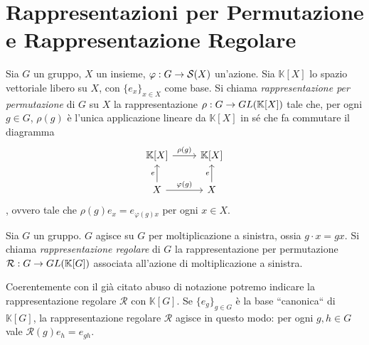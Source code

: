 \section{Rappresentazioni per Permutazione e Rappresentazione Regolare}

\begin{definition}
Sia $G$ un gruppo, $X$ un insieme, $\varphi:G\to \mathcal{S}(X)$ un'azione. Sia $\mathbb{K}[X]$ lo spazio vettoriale libero su $X$, con $\{e_x\}_{x\in X}$ come base. Si chiama \emph{rappresentazione per permutazione} di $G$ su $X$ la rappresentazione $\rho:G\to GL(\mathbb{K}[X])$ tale che, per ogni $g\in G$, $\rho(g)$ è l'unica applicazione lineare da $\mathbb{K}[X]$ in sé che fa commutare il diagramma
$$
\begin{tikzcd}
\mathbb{K}[X]\arrow[r,"\rho(g)"]&\mathbb{K}[X]\\
X\arrow[u,"e"]\arrow[r,"\varphi(g)"]&X\arrow[u,"e"]
\end{tikzcd}
$$
, ovvero tale che $\rho(g)e_x=e_{\varphi(g)x}$ per ogni $x\in X$.
\end{definition}

\begin{definition}
Sia $G$ un gruppo. $G$ agisce su $G$ per moltiplicazione a sinistra, ossia $g\cdot x=gx$. Si chiama \emph{rappresentazione regolare} di $G$ la rappresentazione per permutazione $\mathcal{R}:G\to GL(\mathbb{K}[G])$ associata all'azione di moltiplicazione a sinistra.
\end{definition}

Coerentemente con il già citato abuso di notazione potremo indicare la rappresentazione regolare $\mathcal{R}$ con $\mathbb{K}[G]$. Se $\{e_g\}_{g\in G}$ è la base ``canonica`` di $\mathbb{K}[G]$, la rappresentazione regolare $\mathcal{R}$ agisce in questo modo: per ogni $g,h\in G$ vale $\mathcal{R}(g)e_h=e_{gh}$.

